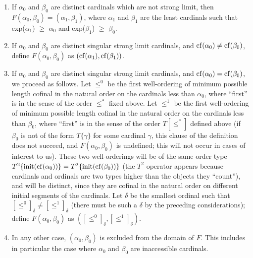 \begin{enumerate}
 \item If $\alpha_0$ and $\beta_0$ are distinct cardinals which are not
   strong limit, then $F(\alpha_0,\beta_0) =
   (\alpha_{1},\beta_{1})$, 
   where $\alpha_{1}$ and $\beta_{1}$ are the least cardinals
   such that exp($\alpha_{1}$) $\geq$ $\alpha_0$ and
   exp($\beta_{1}$) $\geq$ $\beta_0$.

 \item If $\alpha_0$ and $\beta_0$ are distinct singular strong limit
   cardinals, and $\mathop{\mathrm{cf}}(\alpha_0) \neq \mathop{\mathrm{cf}}(\beta_0)$, define
   $F(\alpha_0,\beta_0)$ as $(\mathop{\mathrm{cf}}(\alpha_1),\mathop{\mathrm{cf}}(\beta_1))$.

 \item If $\alpha_0$ and $\beta_0$ are distinct singular strong limit
   cardinals, and $\mathop{\mathrm{cf}}(\alpha_0) = \mathop{\mathrm{cf}}(\beta_0)$,
   we proceed as follows.  Let $\leq^0$ be the first well-ordering of
   minimum possible length cofinal in the natural order on the cardinals
   less than $\alpha_0$, where ``first'' is in the sense of the order
   $\leq^*$ fixed above.  Let $\leq^1$ be the first well-ordering of
   minimum possible length cofinal in the natural order on the cardinals
   less than $\beta_0$, where ``first'' is in the sense of the order
   $T[\leq^*]$ defined above (if $\beta_0$ is not of the form
   $T\{\gamma\}$ for some cardinal $\gamma$, this clause of the definition
   does not succeed, and $F(\alpha_0,\beta_0)$ is undefined; this will
   not occur in cases of interest to us).  These two well-orderings will
   be of the same order type $T^2\{\mathop{\mathrm{init}}(\mathop{\mathrm{cf}}(\alpha_0))\} =
   T^2\{\mathop{\mathrm{init}}(\mathop{\mathrm{cf}}(\beta_0))\}$ (the $T^2$ operator appears because
   cardinals and ordinals are two types higher than the objects they
   ``count''), and will be distinct, since they are cofinal in the
   natural order on different initial segments of the cardinals.  Let
   $\delta$ be the smallest ordinal such that $[\leq^0]_{\delta} \neq
   [\leq^1]_{\delta}$ (there must be such a $\delta$ by the preceding
   considerations); define $F(\alpha_0,\beta_0)$ as
   $([\leq^0]_{\delta},[\leq^1]_{\delta})$.

 \item In any other case, $(\alpha_{0},\beta_{0})$ is excluded from
   the domain of $F$.  This includes in particular the case where
   $\alpha_{0}$ and $\beta_{0}$ are inaccessible cardinals.
\end{enumerate}

